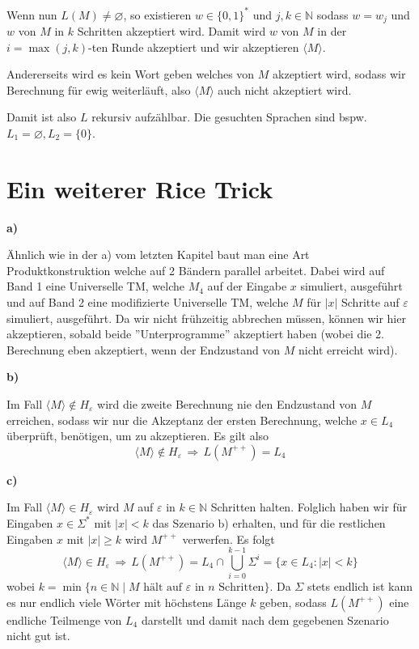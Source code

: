 \documentclass[a4paper,graphics,11pt]{article}
\newcommand{\eps}[0]{\varepsilon}
\newcommand{\godel}[1]{\langle #1 \rangle}
\begin{document}
Wenn nun $L(M) \neq \varnothing$, so existieren $w \in \{0,1\}^*$ und $j,k \in \mathbb{N}$ sodass
$w = w_j$ und $w$ von $M$ in $k$ Schritten akzeptiert wird. Damit wird $w$ von $M$ in der $i = \max(j,k)$-ten
Runde akzeptiert und wir akzeptieren $\godel{M}$.

Andererseits wird es kein Wort geben welches von $M$ akzeptiert wird, sodass wir Berechnung für ewig
weiterläuft, also $\godel{M}$ auch nicht akzeptiert wird.

Damit ist also $L$ rekursiv aufzählbar. Die gesuchten Sprachen sind bspw. $L_1 = \varnothing, L_2 = \{0\}$.

\newpage

\section{Ein weiterer Rice Trick}

\textbf{a)}

Ähnlich wie in der a) vom letzten Kapitel baut man eine Art Produktkonstruktion welche auf 2 Bändern
parallel arbeitet. Dabei wird auf Band 1 eine Universelle TM, welche $M_4$ auf der Eingabe $x$ simuliert,
ausgeführt und auf Band 2 eine modifizierte Universelle TM, welche $M$ für $|x|$ Schritte auf $\eps$ simuliert,
ausgeführt. Da wir nicht frühzeitig abbrechen müssen, können wir hier akzeptieren, sobald beide ''Unterprogramme''
akzeptiert haben (wobei die 2. Berechnung eben akzeptiert, wenn der Endzustand von $M$ nicht erreicht wird).

\strut

\textbf{b)}

Im Fall $\godel{M} \notin H_\eps$ wird die zweite Berechnung nie den Endzustand von $M$ erreichen, sodass
wir nur die Akzeptanz der ersten Berechnung, welche $x \in L_4$ überprüft, benötigen, um zu akzeptieren.
Es gilt also
$$
    \godel{M} \notin H_\eps \,\Longrightarrow\, L(M^{++}) = L_4
$$

\textbf{c)}

Im Fall $\godel{M} \in H_\eps$ wird $M$ auf $\eps$ in $k \in \mathbb{N}$ Schritten halten.
Folglich haben wir für Eingaben $x \in \Sigma^*$ mit $|x| < k$ das Szenario b) erhalten,
und für die restlichen Eingaben $x$ mit $|x| \geq k$ wird $M^{++}$ verwerfen. Es folgt
$$
    \godel{M} \in H_\eps \,\Longrightarrow\, L(M^{++}) = L_4 \cap \bigcup_{i=0}^{k-1} \Sigma^i
    = \{x \in L_4 : |x| < k\}
$$
wobei $k = \min\{n \in \mathbb{N} \mid M \text{ hält auf $\eps$ in $n$ Schritten}\}$.
Da $\Sigma$ stets endlich ist kann es nur endlich viele Wörter mit höchstens Länge $k$ geben, sodass
$L(M^{++})$ eine endliche Teilmenge von $L_4$ darstellt und damit nach dem gegebenen Szenario nicht gut ist.
\end{document}
